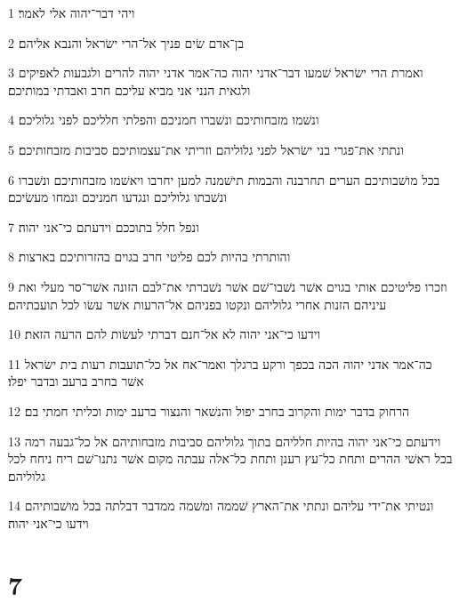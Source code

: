 \par 1 ויהי דבר־יהוה אלי לאמר׃
\par 2 בן־אדם שׂים פניך אל־הרי ישׂראל והנבא אליהם׃
\par 3 ואמרת הרי ישׂראל שׁמעו דבר־אדני יהוה כה־אמר אדני יהוה להרים ולגבעות לאפיקים ולגאית הנני אני מביא עליכם חרב ואבדתי במותיכם׃
\par 4 ונשׁמו מזבחותיכם ונשׁברו חמניכם והפלתי חלליכם לפני גלוליכם׃
\par 5 ונתתי את־פגרי בני ישׂראל לפני גלוליהם וזריתי את־עצמותיכם סביבות מזבחותיכם׃
\par 6 בכל מושׁבותיכם הערים תחרבנה והבמות תישׁמנה למען יחרבו ויאשׁמו מזבחותיכם ונשׁברו ונשׁבתו גלוליכם ונגדעו חמניכם ונמחו מעשׂיכם׃
\par 7 ונפל חלל בתוככם וידעתם כי־אני יהוה׃
\par 8 והותרתי בהיות לכם פליטי חרב בגוים בהזרותיכם בארצות׃
\par 9 וזכרו פליטיכם אותי בגוים אשׁר נשׁבו־שׁם אשׁר נשׁברתי את־לבם הזונה אשׁר־סר מעלי ואת עיניהם הזנות אחרי גלוליהם ונקטו בפניהם אל־הרעות אשׁר עשׂו לכל תועבתיהם׃
\par 10 וידעו כי־אני יהוה לא אל־חנם דברתי לעשׂות להם הרעה הזאת׃
\par 11 כה־אמר אדני יהוה הכה בכפך ורקע ברגלך ואמר־אח אל כל־תועבות רעות בית ישׂראל אשׁר בחרב ברעב ובדבר יפלו׃
\par 12 הרחוק בדבר ימות והקרוב בחרב יפול והנשׁאר והנצור ברעב ימות וכליתי חמתי בם׃
\par 13 וידעתם כי־אני יהוה בהיות חלליהם בתוך גלוליהם סביבות מזבחותיהם אל כל־גבעה רמה בכל ראשׁי ההרים ותחת כל־עץ רענן ותחת כל־אלה עבתה מקום אשׁר נתנו־שׁם ריח ניחח לכל גלוליהם׃
\par 14 ונטיתי את־ידי עליהם ונתתי את־הארץ שׁממה ומשׁמה ממדבר דבלתה בכל מושׁבותיהם וידעו כי־אני יהוה׃

\chapter{7}

